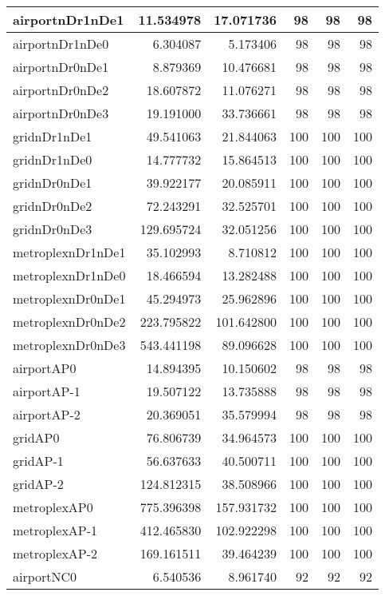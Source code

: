 \begin{longtable}{|l|r|r|r|r|r|}
\endlastfoot
airportnDr1nDe1 & 11.534978 & 17.071736 & 98 & 98 & 98 \\ \hline
airportnDr1nDe0 & 6.304087 & 5.173406 & 98 & 98 & 98 \\ \hline
airportnDr0nDe1 & 8.879369 & 10.476681 & 98 & 98 & 98 \\ \hline
airportnDr0nDe2 & 18.607872 & 11.076271 & 98 & 98 & 98 \\ \hline
airportnDr0nDe3 & 19.191000 & 33.736661 & 98 & 98 & 98 \\ \hline
gridnDr1nDe1 & 49.541063 & 21.844063 & 100 & 100 & 100 \\ \hline
gridnDr1nDe0 & 14.777732 & 15.864513 & 100 & 100 & 100 \\ \hline
gridnDr0nDe1 & 39.922177 & 20.085911 & 100 & 100 & 100 \\ \hline
gridnDr0nDe2 & 72.243291 & 32.525701 & 100 & 100 & 100 \\ \hline
gridnDr0nDe3 & 129.695724 & 32.051256 & 100 & 100 & 100 \\ \hline
metroplexnDr1nDe1 & 35.102993 & 8.710812 & 100 & 100 & 100 \\ \hline
metroplexnDr1nDe0 & 18.466594 & 13.282488 & 100 & 100 & 100 \\ \hline
metroplexnDr0nDe1 & 45.294973 & 25.962896 & 100 & 100 & 100 \\ \hline
metroplexnDr0nDe2 & 223.795822 & 101.642800 & 100 & 100 & 100 \\ \hline
metroplexnDr0nDe3 & 543.441198 & 89.096628 & 100 & 100 & 100 \\ \hline
airportAP0 & 14.894395 & 10.150602 & 98 & 98 & 98 \\ \hline
airportAP-1 & 19.507122 & 13.735888 & 98 & 98 & 98 \\ \hline
airportAP-2 & 20.369051 & 35.579994 & 98 & 98 & 98 \\ \hline
gridAP0 & 76.806739 & 34.964573 & 100 & 100 & 100 \\ \hline
gridAP-1 & 56.637633 & 40.500711 & 100 & 100 & 100 \\ \hline
gridAP-2 & 124.812315 & 38.508966 & 100 & 100 & 100 \\ \hline
metroplexAP0 & 775.396398 & 157.931732 & 100 & 100 & 100 \\ \hline
metroplexAP-1 & 412.465830 & 102.922298 & 100 & 100 & 100 \\ \hline
metroplexAP-2 & 169.161511 & 39.464239 & 100 & 100 & 100 \\ \hline
airportNC0 & 6.540536 & 8.961740 & 92 & 92 & 92 \\ \hline

\end{longtable}
